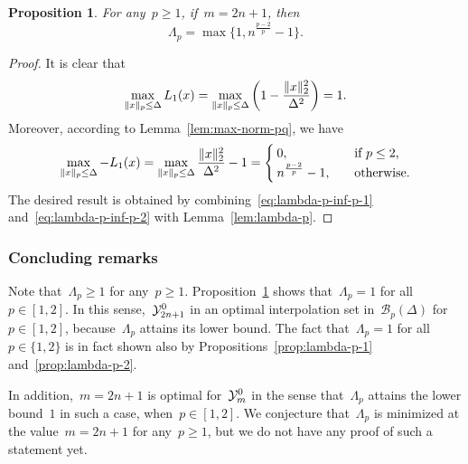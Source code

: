 \documentclass[draft]{article}
\numberwithin{equation}{section}
\theoremstyle{definition}
\theoremstyle{plain}
\newtheorem{proposition}{Proposition}[section]
\newcommand*{\lagp}[1][]{L\ifblank{#1}{}{_{#1}}}
\newcommand*{\norm}[2][]{#1\lVert#2#1\rVert}
\newcommand*{\set}[2][]{#1\{#2#1\}}
\newcommand*{\xpt}[1][]{\mathcal{Y}\ifblank{#1}{}{^{#1}}}
\begin{document}
\begin{proposition}
    \label{prop:lambda-p-opt}
    For any~$p \ge 1$, if~$m = 2n + 1$, then
    \begin{equation*}
        \Lambda_p = \max \set[\big]{1, n^{\frac{p - 2}{p}} - 1}.
    \end{equation*}
\end{proposition}

\begin{proof}
    It is clear that
    \begin{equation}
        \label{eq:lambda-p-inf-p-1}
        \max_{\norm{x}_p \le \Delta} \lagp[1](x) = \max_{\norm{x}_p \le \Delta} \bigg( 1 - \frac{\norm{x}_2^2}{\Delta^2} \bigg) = 1.
    \end{equation}
    Moreover, according to Lemma~\ref{lem:max-norm-pq}, we have
    \begin{equation}
        \label{eq:lambda-p-inf-p-2}
        \max_{\norm{x}_p \le \Delta} -\lagp[1](x) = \max_{\norm{x}_p \le \Delta} \frac{\norm{x}_2^2}{\Delta^2} - 1 =
        \begin{cases}
            0,                          & \quad \text{if~$p \le 2$,}\\
            n^{\frac{p - 2}{p}} - 1,    & \quad \text{otherwise.}
        \end{cases}
    \end{equation}
    The desired result is obtained by combining~\eqref{eq:lambda-p-inf-p-1} and~\eqref{eq:lambda-p-inf-p-2} with Lemma~\ref{lem:lambda-p}.
\end{proof}

\subsubsection{Concluding remarks}

Note that~$\Lambda_p \ge 1$ for any~$p \ge 1$.
Proposition~\ref{prop:lambda-p-opt} shows that~$\Lambda_p = 1$ for all~$p \in [1, 2]$.
In this sense,~$\xpt[0]_{2n + 1}$ in an optimal interpolation set in~$\mathcal{B}_p(\Delta)$ for~$p \in [1, 2]$, because~$\Lambda_p$ attains its lower bound.
The fact that~$\Lambda_p = 1$ for all~$p \in \set{1, 2}$ is in fact shown also by Propositions~\ref{prop:lambda-p-1} and~\ref{prop:lambda-p-2}.

In addition,~$m = 2n + 1$ is optimal for~$\xpt[0]_m$ in the sense that~$\Lambda_p$ attains the lower bound~$1$ in such a case, when~$p \in [1, 2]$.
We conjecture that~$\Lambda_p$ is minimized at the value~$m = 2n + 1$ for any~$p \ge 1$, but we do not have any proof of such a statement yet.
\end{document}
